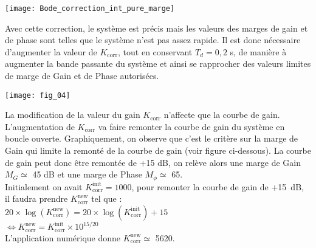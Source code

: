 \begin{multicols}{2}
\begin{corrige}
 
\begin{center}
      \texttt{[image: Bode\_correction\_int\_pure\_marge]}
\end{center}
\end{corrige}
\fi

\ifprof
\else
Avec cette correction, le système est précis mais les valeurs des marges de gain et de phase sont telles que le système n'est pas assez rapide. Il est donc nécessaire d'augmenter la valeur de $K_{\text{corr}}$, tout en conservant $T_d = 0,2$ s, de manière à augmenter la bande passante du système et ainsi se rapprocher des valeurs limites de marge de Gain et de Phase autorisées.
\fi



\begin{center}
\texttt{[image: fig\_04]}
\end{center}

\ifprof
\begin{corrige}
La modification de la valeur du gain $K_{\text{corr}}$ n'affecte que la courbe de gain. L'augmentation de $K_{\text{corr}}$ va faire remonter la courbe de gain du système en boucle ouverte. Graphiquement, on observe que c'est le critère sur la marge de Gain qui limite la remonté de la courbe de gain (voir figure ci-dessous). La courbe de gain peut donc être remontée de +15 dB, on relève alors une marge de Gain $M_G \simeq$ 45 dB et une marge de Phase $M_{\phi} \simeq$ 65\degre. \\
Initialement on avait $K_{\text{corr}}^{\text{init}} = 1000$, pour remonter la courbe de gain de +\SI{15}{dB}, il faudra prendre $K_{\text{corr}}^{\text{new}}$ tel que : \\
$20 \times \log(K_{\text{corr}}^{\text{new}}) = 20 \times \log(K_{\text{corr}}^{\text{init}}) + 15$\\
$\Leftrightarrow K_{\text{corr}}^{\text{new}} = K_{\text{corr}}^{\text{init}} \times 10^{15/20}$\\
L'application numérique donne $K_{\text{corr}}^{\text{new}} \simeq$ 5620. 
 

\end{corrige}
\end{multicols}
